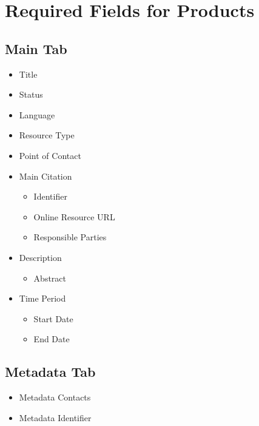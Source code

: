 \documentclass[
]{book}
\providecommand{\tightlist}{%
  \setlength{\itemsep}{0pt}\setlength{\parskip}{0pt}}
\begin{document}
\hypertarget{required-fields-for-products}{%
\section*{Required Fields for Products}\label{required-fields-for-products}}

\hypertarget{main-tab-2}{%
\subsection*{Main Tab}\label{main-tab-2}}

\begin{itemize}
\tightlist
\item
  Title
\item
  Status
\item
  Language
\item
  Resource Type
\item
  Point of Contact
\item
  Main Citation

  \begin{itemize}
  \tightlist
  \item
    Identifier
  \item
    Online Resource URL
  \item
    Responsible Parties
  \end{itemize}
\item
  Description

  \begin{itemize}
  \tightlist
  \item
    Abstract
  \end{itemize}
\item
  Time Period

  \begin{itemize}
  \tightlist
  \item
    Start Date
  \item
    End Date
  \end{itemize}
\end{itemize}

\hypertarget{metadata-tab-1}{%
\subsection*{Metadata Tab}\label{metadata-tab-1}}

\begin{itemize}
\tightlist
\item
  Metadata Contacts
\item
  Metadata Identifier
\end{itemize}
\end{document}

